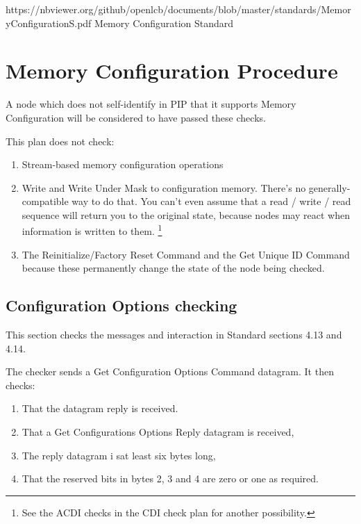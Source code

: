 



\maketitle
\thispagestyle{firststyle}

\introductionCaveats
    {https://nbviewer.org/github/openlcb/documents/blob/master/standards/MemoryConfigurationS.pdf}
    {Memory Configuration Standard}

\section{Memory Configuration Procedure}


A node which does not self-identify in PIP that it supports
Memory Configuration will be considered to have passed these checks.
\pipsetFootnote

This plan does not check:
\begin{enumerate}
\item Stream-based memory configuration operations
\item Write and Write Under Mask to configuration memory.  
There's no generally-compatible way to do that.
You can't even assume that a read / write / read sequence will return you to the original
state, because nodes may react when information is written to them.
\footnote{See the ACDI checks in the CDI check plan for another possibility.}
\item The Reinitialize/Factory Reset Command and the Get Unique ID Command
because these permanently change the state of the node being checked.
\end{enumerate}

\subsection{Configuration Options checking}

This section checks the messages and interaction in Standard sections 4.13 and 4.14.

The checker sends a Get Configuration Options Command datagram.  It then checks:
\begin{enumerate}
\item That the datagram reply is received.
\item That a Get Configurations Options Reply datagram is received,
\item The reply datagram i sat least six bytes long,
\item That the reserved bits in bytes 2, 3 and 4 are zero or one as required.
\end{enumerate}


